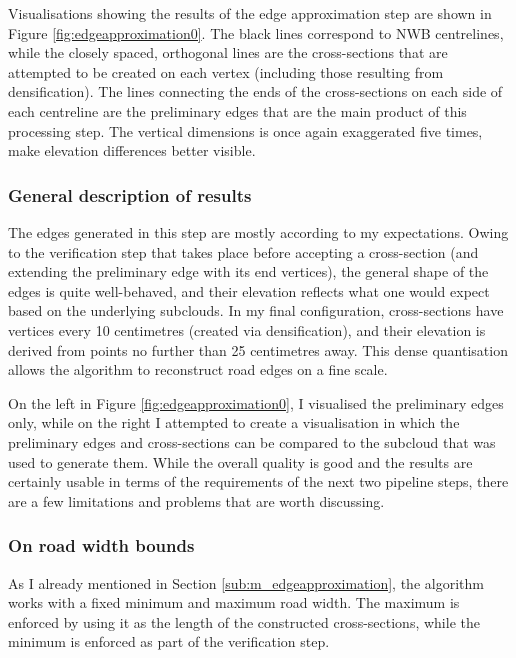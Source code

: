 Visualisations showing the results of the edge approximation step are shown in Figure \ref{fig:edgeapproximation0}. The black lines correspond to NWB centrelines, while the closely spaced, orthogonal lines are the cross-sections that are attempted to be created on each vertex (including those resulting from densification). The lines connecting the ends of the cross-sections on each side of each centreline are the preliminary edges that are the main product of this processing step. The vertical dimensions is once again exaggerated five times, make elevation differences better visible.

\subsubsection{General description of results}

The edges generated in this step are mostly according to my expectations. Owing to the verification step that takes place before accepting a cross-section (and extending the preliminary edge with its end vertices), the general shape of the edges is quite well-behaved, and their elevation reflects what one would expect based on the underlying subclouds. In my final configuration, cross-sections have vertices every 10 centimetres (created via densification), and their elevation is derived from points no further than 25 centimetres away. This dense quantisation allows the algorithm to reconstruct road edges on a fine scale.

On the left in Figure \ref{fig:edgeapproximation0}, I visualised the preliminary edges only, while on the right I attempted to create a visualisation in which the preliminary edges and cross-sections can be compared to the subcloud that was used to generate them. While the overall quality is good and the results are certainly usable in terms of the requirements of the next two pipeline steps, there are a few limitations and problems that are worth discussing.

\subsubsection{On road width bounds}

As I already mentioned in Section \ref{sub:m_edgeapproximation}, the algorithm works with a fixed minimum and maximum road width. The maximum is enforced by using it as the length of the constructed cross-sections, while the minimum is enforced as part of the verification step.

